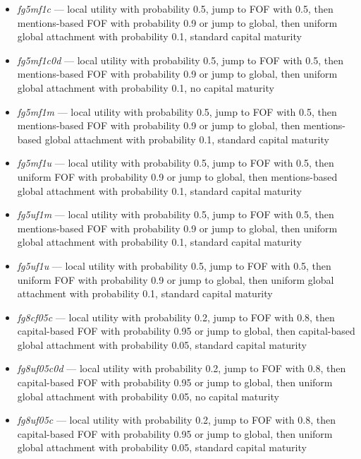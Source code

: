 \documentclass[10pt,oneside]{memoir}
\begin{document}
\begin{Spacing}{2}
\begin{itemize}
\item {\itshape fg5mf1c} --- local utility with probability 0.5, jump to FOF with 0.5, then mentions-based FOF with probability 0.9 or jump to global, then uniform global attachment with probability 0.1, standard capital maturity

\item {\itshape fg5mf1c0d} --- local utility with probability 0.5, jump to FOF with 0.5, then mentions-based FOF with probability 0.9 or jump to global, then uniform global attachment with probability 0.1, no capital maturity

\item {\itshape fg5mf1m} --- local utility with probability 0.5, jump to FOF with 0.5, then mentions-based FOF with probability 0.9 or jump to global, then mentions-based global attachment with probability 0.1, standard capital maturity

\item {\itshape fg5mf1u} --- local utility with probability 0.5, jump to FOF with 0.5, then uniform FOF with probability 0.9 or jump to global, then mentions-based global attachment with probability 0.1, standard capital maturity

\item {\itshape fg5uf1m} --- local utility with probability 0.5, jump to FOF with 0.5, then mentions-based FOF with probability 0.9 or jump to global, then uniform global attachment with probability 0.1, standard capital maturity

\item {\itshape fg5uf1u} --- local utility with probability 0.5, jump to FOF with 0.5, then uniform FOF with probability 0.9 or jump to global, then uniform global attachment with probability 0.1, standard capital maturity

\item {\itshape fg8cf05c} --- local utility with probability 0.2, jump to FOF with 0.8, then capital-based FOF with probability 0.95 or jump to global, then capital-based global attachment with probability 0.05, standard capital maturity

\item {\itshape fg8uf05c0d} --- local utility with probability 0.2, jump to FOF with 0.8, then capital-based FOF with probability 0.95 or jump to global, then uniform global attachment with probability 0.05, no capital maturity

\item {\itshape fg8uf05c} --- local utility with probability 0.2, jump to FOF with 0.8, then capital-based FOF with probability 0.95 or jump to global, then uniform global attachment with probability 0.05, standard capital maturity


\end{itemize}
\end{Spacing}
\end{document}
